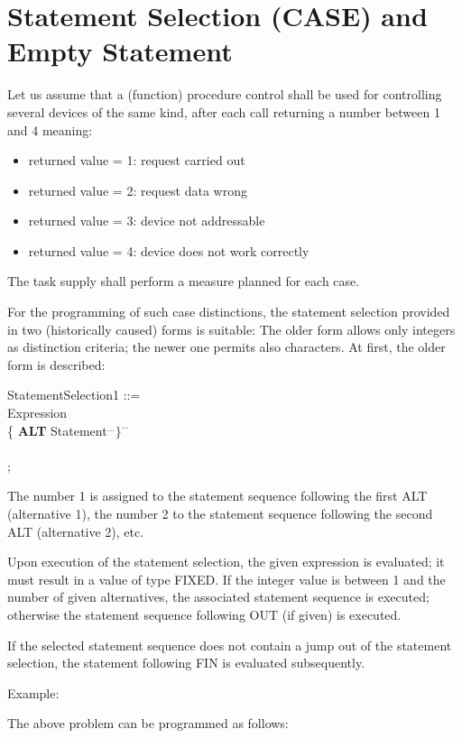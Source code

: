 \section{Statement Selection (CASE) and Empty Statement}  %

Let us assume that a (function) procedure control shall be used for
controlling several devices of the same kind, after each call returning
a number between 1 and 4 meaning:
\begin{itemize}
\item returned value = 1: request carried out
\item returned value = 2: request data wrong
\item returned value = 3: device not addressable
\item returned value = 4: device does not work correctly
\end{itemize}

The task supply shall perform a measure planned for each case.

For the programming of such case distinctions, the statement selection
provided in two (historically caused) forms is suitable: The older form
allows only integers as distinction criteria; the newer one permits also
characters. At first, the older form is described:

StatementSelection1 ::=\\
 Expression\\
\x \x \{ {\bf ALT} Statement$^{...} \}^{...}$\\
\x {}\\
;

The number 1 is assigned to the statement sequence following the first
ALT (alternative 1), the number 2 to the statement sequence following
the second ALT (alternative 2), etc.

Upon execution of the statement selection, the given expression is
evaluated; it must result in a value of type FIXED. If the integer value
is between 1 and the number of given alternatives, the associated
statement sequence is executed; otherwise the statement sequence
following OUT (if given) is executed.

If the selected statement sequence does not contain a jump out of the
statement selection, the statement following FIN is evaluated
subsequently.

Example:

The above problem can be programmed as follows:

